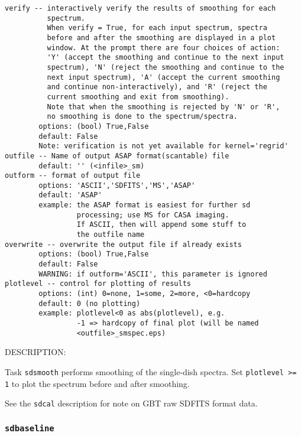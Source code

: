 \begin{verbatim}
verify -- interactively verify the results of smoothing for each
          spectrum.
          When verify = True, for each input spectrum, spectra
          before and after the smoothing are displayed in a plot
          window. At the prompt there are four choices of action:
          'Y' (accept the smoothing and continue to the next input
          spectrum), 'N' (reject the smoothing and continue to the
          next input spectrum), 'A' (accept the current smoothing
          and continue non-interactively), and 'R' (reject the
          current smoothing and exit from smoothing).
          Note that when the smoothing is rejected by 'N' or 'R',
          no smoothing is done to the spectrum/spectra. 
        options: (bool) True,False
        default: False
        Note: verification is not yet available for kernel='regrid'
outfile -- Name of output ASAP format(scantable) file
        default: '' (<infile>_sm)
outform -- format of output file
        options: 'ASCII','SDFITS','MS','ASAP'
        default: 'ASAP'
        example: the ASAP format is easiest for further sd
                 processing; use MS for CASA imaging.
                 If ASCII, then will append some stuff to
                 the outfile name
overwrite -- overwrite the output file if already exists
        options: (bool) True,False
        default: False
        WARNING: if outform='ASCII', this parameter is ignored
plotlevel -- control for plotting of results
        options: (int) 0=none, 1=some, 2=more, <0=hardcopy
        default: 0 (no plotting)
        example: plotlevel<0 as abs(plotlevel), e.g.
                 -1 => hardcopy of final plot (will be named
                 <outfile>_smspec.eps)
\end{verbatim}

    DESCRIPTION:

Task {\tt sdsmooth} performs smoothing of the single-dish spectra.
Set {\tt plotlevel >= 1} to plot the spectrum before and after smoothing.
    
See the {\tt sdcal} description for note on GBT raw SDFITS format data.

 
\subsubsection{{\tt sdbaseline}}
\label{section:sd.sdtasks.tasks.sdbaseline}

